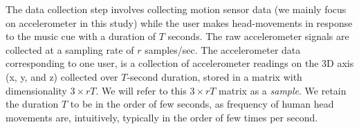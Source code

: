 The data collection step involves collecting motion sensor data (we mainly focus on accelerometer in this study) while the user makes head-movements
in response to the music cue  with a duration of $T$ seconds.
The raw accelerometer
signals are collected at
a sampling rate of $r$ samples/sec. %
The accelerometer data corresponding to one user,  is a
collection of accelerometer readings on the
3D axis (x, y, and z) collected over $T$-second duration, 
stored in a matrix with dimensionality $3\times rT$. %
We will refer to this $3\times rT$ matrix as a {\em sample}.
We retain the duration $T$ to be in the order of few seconds, as frequency of
human head movements are, intuitively, typically in the order of few times per
second. %





